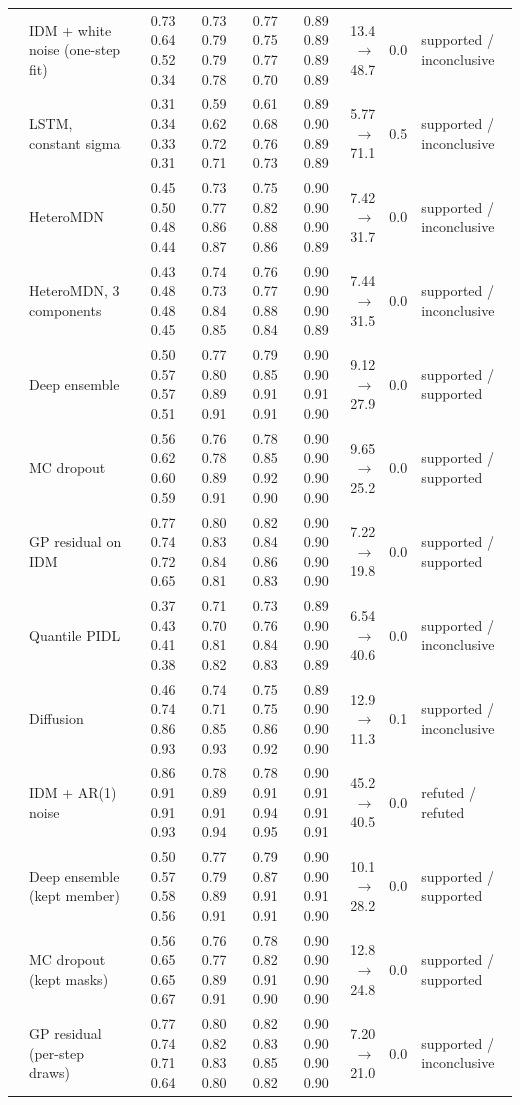 \begin{longtable}{llrrrrrrl}
 & IDM + white noise (one-step fit) & 0.73 0.64 0.52 0.34 & 0.73 0.79 0.79 0.78 & 0.77 0.75 0.77 0.70 & 0.89 0.89 0.89 0.89 & 13.4 $\rightarrow$ 48.7 & 0.0 & supported / inconclusive \\
 & LSTM, constant sigma & 0.31 0.34 0.33 0.31 & 0.59 0.62 0.72 0.71 & 0.61 0.68 0.76 0.73 & 0.89 0.90 0.89 0.89 & 5.77 $\rightarrow$ 71.1 & 0.5 & supported / inconclusive \\
 & HeteroMDN & 0.45 0.50 0.48 0.44 & 0.73 0.77 0.86 0.87 & 0.75 0.82 0.88 0.86 & 0.90 0.90 0.90 0.89 & 7.42 $\rightarrow$ 31.7 & 0.0 & supported / inconclusive \\
 & HeteroMDN, 3 components & 0.43 0.48 0.48 0.45 & 0.74 0.73 0.84 0.85 & 0.76 0.77 0.88 0.84 & 0.90 0.90 0.90 0.89 & 7.44 $\rightarrow$ 31.5 & 0.0 & supported / inconclusive \\
 & Deep ensemble & 0.50 0.57 0.57 0.51 & 0.77 0.80 0.89 0.91 & 0.79 0.85 0.91 0.91 & 0.90 0.90 0.91 0.90 & 9.12 $\rightarrow$ 27.9 & 0.0 & supported / supported \\
 & MC dropout & 0.56 0.62 0.60 0.59 & 0.76 0.78 0.89 0.91 & 0.78 0.85 0.92 0.90 & 0.90 0.90 0.90 0.90 & 9.65 $\rightarrow$ 25.2 & 0.0 & supported / supported \\
 & GP residual on IDM & 0.77 0.74 0.72 0.65 & 0.80 0.83 0.84 0.81 & 0.82 0.84 0.86 0.83 & 0.90 0.90 0.90 0.90 & 7.22 $\rightarrow$ 19.8 & 0.0 & supported / supported \\
 & Quantile PIDL & 0.37 0.43 0.41 0.38 & 0.71 0.70 0.81 0.82 & 0.73 0.76 0.84 0.83 & 0.89 0.90 0.90 0.89 & 6.54 $\rightarrow$ 40.6 & 0.0 & supported / inconclusive \\
 & Diffusion & 0.46 0.74 0.86 0.93 & 0.74 0.71 0.85 0.93 & 0.75 0.75 0.86 0.92 & 0.89 0.90 0.90 0.90 & 12.9 $\rightarrow$ 11.3 & 0.1 & supported / inconclusive \\
 & IDM + AR(1) noise & 0.86 0.91 0.91 0.93 & 0.78 0.89 0.91 0.94 & 0.78 0.91 0.94 0.95 & 0.90 0.91 0.91 0.91 & 45.2 $\rightarrow$ 40.5 & 0.0 & refuted / refuted \\
 & Deep ensemble (kept member) & 0.50 0.57 0.58 0.56 & 0.77 0.79 0.89 0.91 & 0.79 0.87 0.91 0.91 & 0.90 0.90 0.91 0.90 & 10.1 $\rightarrow$ 28.2 & 0.0 & supported / supported \\
 & MC dropout (kept masks) & 0.56 0.65 0.65 0.67 & 0.76 0.77 0.89 0.91 & 0.78 0.82 0.91 0.90 & 0.90 0.90 0.90 0.90 & 12.8 $\rightarrow$ 24.8 & 0.0 & supported / supported \\
 & GP residual (per-step draws) & 0.77 0.74 0.71 0.64 & 0.80 0.82 0.83 0.80 & 0.82 0.83 0.85 0.82 & 0.90 0.90 0.90 0.90 & 7.20 $\rightarrow$ 21.0 & 0.0 & supported / inconclusive \\
\end{longtable}
\endgroup
